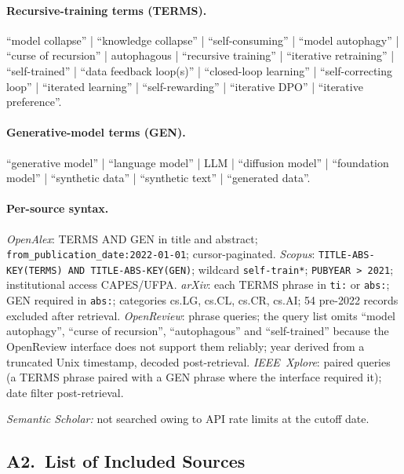 \smallskip
\paragraph{Recursive-training terms (TERMS).}
``model collapse'' | ``knowledge collapse'' | ``self-consuming'' |
``model autophagy'' | ``curse of recursion'' | autophagous | ``recursive training'' |
``iterative retraining'' | ``self-trained'' | ``data feedback loop(s)'' |
``closed-loop learning'' | ``self-correcting loop'' | ``iterated learning'' |
``self-rewarding'' | ``iterative DPO'' | ``iterative preference''.

\paragraph{Generative-model terms (GEN).}
``generative model'' | ``language model'' | LLM | ``diffusion model'' |
``foundation model'' | ``synthetic data'' | ``synthetic text'' | ``generated data''.

\paragraph{Per-source syntax.}
\emph{OpenAlex}: TERMS AND GEN in title and abstract;
\texttt{from\_publication\_date:2022-01-01}; cursor-paginated.
\emph{Scopus}: \texttt{TITLE-ABS-KEY(TERMS) AND TITLE-ABS-KEY(GEN)};
wildcard \texttt{self-train*}; \texttt{PUBYEAR > 2021}; institutional access CAPES/UFPA.
\emph{arXiv}: each TERMS phrase in \texttt{ti:} or \texttt{abs:}; GEN required in \texttt{abs:};
categories cs.LG, cs.CL, cs.CR, cs.AI; 54 pre-2022 records excluded after retrieval.
\emph{OpenReview}: \NqOpenReview{} phrase queries; the query list omits
``model autophagy'', ``curse of recursion'', ``autophagous'' and ``self-trained''
because the OpenReview interface does not support them reliably;
year derived from a truncated Unix timestamp, decoded post-retrieval.
\emph{IEEE~Xplore}: \NqIEEE{} paired queries (a TERMS phrase paired with a GEN phrase
where the interface required it); date filter post-retrieval.

\smallskip
\noindent\textit{Semantic Scholar:} not searched owing to API rate limits at the cutoff date.


\subsection*{A2.\ List of Included Sources}

